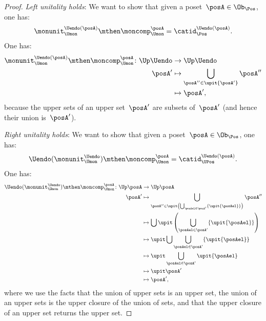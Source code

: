\begin{proof}
    \emph{Left unitality holds}: We want to show that given a poset~$\posA\in \Ob_\Pos$, one has:
    \begin{equation}
        \monunit_{\Umon}^{\Uendo(\posA)}\mthen \moncomp_{\Umon}^{\posA}=\catid_{\Pos}^{\Uendo(\posA)}.
    \end{equation}
    One has:
    \begin{equation}
        \begin{aligned}
            \monunit_{\Umon}^{\Uendo(\posA)}\mthen \moncomp_{\Umon}^{\posA}\colon \Up \Uendo & \to \Up \Uendo \\
            \posA'                                                                           & \mapsto \bigcup_{\posA''\in \upit \{ \posA'\}} \posA'' \\
                                                                                             & \mapsto \posA',
        \end{aligned}
    \end{equation}
    because the upper sets of an upper set~$\posA'$ are subsets of~$\posA'$ (and hence their union is~$\posA'$).

    \emph{Right unitality holds}: We want to show that given a poset~$\posA\in \Ob_\Pos$, one has:
    \begin{equation}
        \Uendo(\monunit_{\Umon}^{\Uendo})\mthen \moncomp_{\Umon}^{\posA}=\catid_{\UPos}^{\Uendo(\posA)}.
    \end{equation}
    One has:
    \begin{equation*}
        \begin{aligned}
            \Uendo(\monunit_{\Umon}^{\Uendo})\mthen \moncomp_{\Umon}^{\posA}\colon \Up \posA & \to \Up \posA \\
            \posA'                                                                           & \mapsto \bigcup_{\posA''\in \upit \left( \bigcup_{\posAel \in \posA'}\{ \upit \{\posAel\}\}\right)}\posA'' \\
                                                                                             & \mapsto \bigcup \upit \left( \bigcup_{\posAel \in \posA'}\{\upit \{ \posAel\} \}\right) \\
                                                                                             & \mapsto \upit \bigcup   \bigcup_{\posAel \in \posA'}\{\upit \{ \posAel\} \} \\
                                                                                             & \mapsto \upit \bigcup_{\posAel \in \posA'}\upit \{ \posAel\} \\
                                                                                             & \mapsto \upit \posA' \\
                                                                                             & \mapsto \posA',
        \end{aligned}
    \end{equation*}
    where we use the facts that the union of upper sets is an upper set, the union of an upper sets is the upper closure of the union of sets, and that the upper closure of an upper set returns the upper set.


\end{proof}
